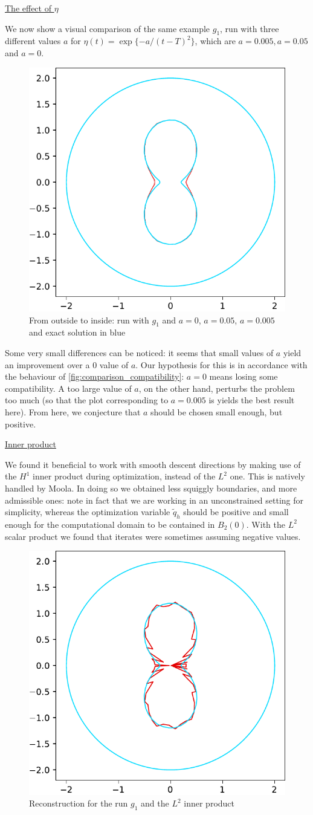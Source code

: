 \documentclass[english,a4paper,9pt,oneside]{scrbook}	%
\theoremstyle{break}
\theoremstyle{remark}
\begin{document}
\underline{The effect of $\eta$}

We now show a visual comparison of the same example $g_1$, run with three different values $a$ for $\eta(t) = \exp\{-a/(t-T)^2\}$, which are $a=0.005, a = 0.05$ and $a=0$.

\begin{figure}[H]
\centering
\includegraphics[width=0.2\columnwidth]{Images/hourglass_constant_no_eta_more_eta_cropped.pdf}
\caption{From outside to inside: run with $g_1$ and $a=0$, $a = 0.05$, $a=0.005$ and exact solution in blue}\label{fig:eta_run}
\end{figure}

Some very small differences can be noticed: it seems that small values of $a$ yield an improvement over a $0$ value of $a$. Our hypothesis for this is in accordance with the behaviour of \cref{fig:comparison_compatibility}: $a=0$ means losing some compatibility. A too large value of $a$, on the other hand, perturbs the problem too much (so that the plot corresponding to $a=0.005$ is yields the best result here). From here, we conjecture that $a$ should be chosen small enough, but positive.


\underline{Inner product}

We found it beneficial to work with smooth descent directions by making use of the $H^1$ inner product during optimization, instead of the $L^2$ one. This is natively handled by Moola. In doing so we obtained less squiggly boundaries, and more admissible ones: note in fact that we are working in an unconstrained setting for simplicity, whereas the optimization variable $\tilde{q}_h$ should be positive and small enough for the computational domain to be contained in $B_{2}(0)$. With the $L^2$ scalar product we found that iterates were sometimes assuming negative values.

\begin{figure}[H]
\centering
\includegraphics[height=0.3\columnwidth]{Images/hourglass_constant_l2/comparison.pdf}
\caption{Reconstruction for the run $g_1$ and the $L^2$ inner product}\label{fig:l2}
\end{figure}
\end{document}
